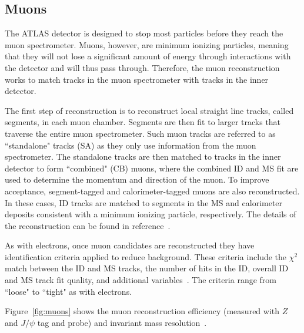 \subsection{Muons}

The ATLAS detector is designed to stop most particles before they reach the muon spectrometer. Muons, however, are minimum ionizing particles, meaning that they will not lose a significant amount of energy through interactions with the detector and will thus pass through. Therefore, the muon reconstruction works to match tracks in the muon spectrometer with tracks in the inner detector. 

The first step of reconstruction is to reconstruct local straight line tracks, called segments, in each muon chamber. Segments are then fit to larger tracks that traverse the entire muon spectrometer. Such muon tracks are referred to as ``standalone" tracks (SA) as they only use information from the muon spectrometer. The standalone tracks are then matched to tracks in the inner detector to form ``combined" (CB) muons, where the combined ID and MS fit are used to determine the momentum and direction of the muon. To improve acceptance, segment-tagged and calorimeter-tagged muons are also reconstructed. In these cases, ID tracks are matched to segments in the MS and calorimeter deposits consistent with a minimum ionizing particle, respectively. The details of the reconstruction can be found in reference~\cite{MuonReco}.

As with electrons, once muon candidates are reconstructed they have identification criteria applied to reduce background. These criteria include the $\chi^2$ match between the ID and MS tracks, the number of hits in the ID, overall ID and MS track fit quality, and additional variables~\cite{MuonReco}. The criteria range from ``loose" to ``tight" as with electrons. 

Figure~\ref{fig:muons} shows the muon reconstruction efficiency (measured with $Z$ and $J/\psi$ tag and probe) and invariant mass resolution~\cite{MuonReco}. 

